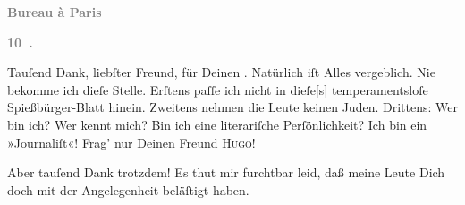 \pstart
           \begin{otherlanguage}{french}\textcolor{gray}{\textbf{\textbf{Bureau à Paris}}}\end{otherlanguage}\pend
           
\pstart
           \begin{otherlanguage}{french}\textcolor{gray}{\textbf{\textbf{10 .}}}\end{otherlanguage}\pend
           \vspace{0.5em}
\pstart
           Tauſend Dank, liebſter Freund, für Deinen \label{K_L02837-1v}\label{K_L02837-1}. Natürlich iſt Alles vergeblich. Nie bekomme ich dieſe Stelle. Erſtens paſſe ich nicht in
                  dieſe{[}s{]} temperamentsloſe Spießbürger-Blatt hinein. Zweitens nehmen die Leute keinen
               Juden. Drittens: Wer bin ich? Wer kennt mich? Bin ich eine literariſche
               Perſönlichkeit? Ich bin ein »Journaliſt«! Frag’ nur Deinen Freund \textsc{Hugo}!\pend
           
\pstart
           Aber tauſend Dank trotzdem! Es thut mir furchtbar leid, daß meine Leute Dich doch {\pb}mit der Angelegenheit beläſtigt haben.\pend
           
